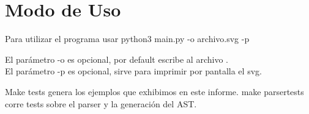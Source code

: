 \section{Modo de Uso}

Para utilizar el programa usar \newline
python3 main.py  -o archivo.svg -p

El parámetro -o es opcional, por default escribe al archivo . \\
El parámetro -p es opcional, sirve para imprimir por pantalla el svg.

Make tests genera los ejemplos que exhibimos en este informe.
make parsertests corre tests sobre el parser y la generación del AST.